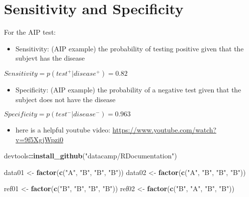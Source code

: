 \documentclass[]{article}
\newenvironment{Shaded}{\begin{snugshade}}{\end{snugshade}}
\newcommand{\KeywordTok}[1]{\textcolor[rgb]{0.13,0.29,0.53}{\textbf{#1}}}
\newcommand{\NormalTok}[1]{#1}
\newcommand{\OperatorTok}[1]{\textcolor[rgb]{0.81,0.36,0.00}{\textbf{#1}}}
\newcommand{\StringTok}[1]{\textcolor[rgb]{0.31,0.60,0.02}{#1}}
\providecommand{\tightlist}{%
  \setlength{\itemsep}{0pt}\setlength{\parskip}{0pt}}
\begin{document}
\hypertarget{sensitivity-and-specificity}{%
\section{Sensitivity and
Specificity}\label{sensitivity-and-specificity}}

For the AIP test:

\begin{itemize}
\tightlist
\item
  Sensitivity: (AIP example) the probability of testing positive given
  that the subjevt has the disease
\end{itemize}

\(Sensitivity = p(test^+|disease^+)=0.82\)

\begin{itemize}
\tightlist
\item
  Specificity: (AIP example) the probability of a negative test given
  that the subject does not have the disease
\end{itemize}

\(Specificity = p(test^-|disease^-)=0.963\)

\begin{itemize}
\tightlist
\item
  here is a helpful youtube video:
  \url{https://www.youtube.com/watch?v=9f5XgjWpzi0}
\end{itemize}

\begin{Shaded}
\begin{Highlighting}[]
\NormalTok{devtools}\OperatorTok{::}\KeywordTok{install_github}\NormalTok{(}\StringTok{"datacamp/RDocumentation"}\NormalTok{)}

\NormalTok{data01 <-}\StringTok{ }\KeywordTok{factor}\NormalTok{(}\KeywordTok{c}\NormalTok{(}\StringTok{"A"}\NormalTok{, }\StringTok{"B"}\NormalTok{, }\StringTok{"B"}\NormalTok{, }\StringTok{"B"}\NormalTok{))}
\NormalTok{data02 <-}\StringTok{ }\KeywordTok{factor}\NormalTok{(}\KeywordTok{c}\NormalTok{(}\StringTok{"A"}\NormalTok{, }\StringTok{"B"}\NormalTok{, }\StringTok{"B"}\NormalTok{, }\StringTok{"B"}\NormalTok{))}

\NormalTok{ref01 <-}\StringTok{ }\KeywordTok{factor}\NormalTok{(}\KeywordTok{c}\NormalTok{(}\StringTok{"B"}\NormalTok{, }\StringTok{"B"}\NormalTok{, }\StringTok{"B"}\NormalTok{, }\StringTok{"B"}\NormalTok{))}
\NormalTok{ref02 <-}\StringTok{ }\KeywordTok{factor}\NormalTok{(}\KeywordTok{c}\NormalTok{(}\StringTok{"B"}\NormalTok{, }\StringTok{"A"}\NormalTok{, }\StringTok{"B"}\NormalTok{, }\StringTok{"B"}\NormalTok{))}
\end{Highlighting}
\end{Shaded}
\end{document}
